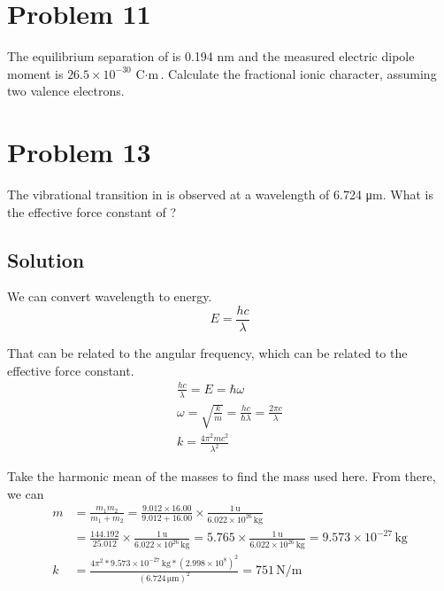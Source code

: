 \documentclass[12pt]{report}
\newcommand{\E}[1]{\times 10^{#1}}
\begin{document}
\section{Problem 11}
    The equilibrium separation of  is 0.194 nm and the measured electric dipole moment is $26.5\E{-30}\,\unit{\coulomb\cdot\meter}$. 
    Calculate the fractional ionic character, assuming two valence electrons.
    \pagebreak

\section{Problem 13} %
    The vibrational transition in  is observed at a wavelength of 6.724 \unit{\micro\meter}. 
    What is the effective force constant of ?

    \subsection{Solution}
        We can convert wavelength to energy.
        \begin{equation}
            E = \frac{hc}{\lambda}
        \end{equation}

        That can be related to the angular frequency, which can be related to the effective force constant.
        \begin{gather}
            \frac{hc}{\lambda} = E = \hbar \omega\\
            \omega = \sqrt{\frac{k}{m}} = \frac{hc}{\hbar\lambda} = \frac{2\pi c}{\lambda}\\
            k = \frac{4 \pi^2 mc^2}{\lambda^2}
        \end{gather}

        Take the harmonic mean of the masses to find the mass used here.
        From there, we can 
        \begin{align}
            m   &=  \frac{m_1 m_2}{m_1 + m_2}
                =   \frac{9.012 \times 16.00}{9.012 + 16.00} \times \frac{1\,\unit{\amu}}{6.022\E{26}\,\unit{\kilo\gram}}\\
                &=  \frac{144.192}{25.012} \times \frac{1\,\unit{\amu}}{6.022\E{26}\,\unit{\kilo\gram}}
                =   5.765 \times \frac{1\,\unit{\amu}}{6.022\E{26}\,\unit{\kilo\gram}}
                =   9.573\E{-27}\,\unit{\kilo\gram}\\
            k   &=  \frac{4 \pi^2 * 9.573\E{-27}\,\unit{\kilo\gram} * (2.998\E{8})^2}{(6.724\,\unit{\micro\meter})^2}
                =   \boxed{751\,\unit{\newton/\meter}}
        \end{align}
    \pagebreak
\end{document}
